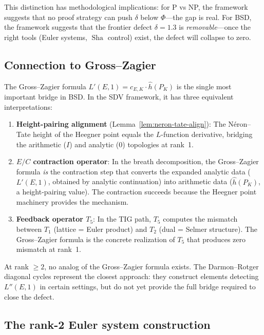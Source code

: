 \documentclass[11pt]{article}
\DeclareMathOperator{\Sha}{Sha}
\begin{document}
This distinction has methodological implications: for P vs NP, the framework
suggests that no proof strategy can push $\delta$ below $\Phi$---the gap is
real.  For BSD, the framework suggests that the frontier defect $\delta = 1.3$
is \emph{removable}---once the right tools (Euler systems, $\Sha$ control)
exist, the defect will collapse to zero.

\subsection{Connection to Gross--Zagier}

The Gross--Zagier formula $L'(E,1) = c_{E,K} \cdot \hat{h}(P_K)$ is the
single most important bridge in BSD.  In the SDV framework, it has three
equivalent interpretations:

\begin{enumerate}
  \item \textbf{Height-pairing alignment} (Lemma~\ref{lem:neron-tate-align}):
    The N\'eron--Tate height of the Heegner point equals the $L$-function
    derivative, bridging the arithmetic ($I$) and analytic ($0$) topologies
    at rank~1.

  \item \textbf{$E/C$ contraction operator}: In the breath decomposition, the
    Gross--Zagier formula \emph{is} the contraction step that converts the
    expanded analytic data ($L'(E,1)$, obtained by analytic continuation) into
    arithmetic data ($\hat{h}(P_K)$, a height-pairing value).  The contraction
    succeeds because the Heegner point machinery provides the mechanism.

  \item \textbf{Feedback operator $T_5$}: In the TIG path, $T_5$ computes the
    mismatch between $T_1$ (lattice = Euler product) and $T_2$ (dual = Selmer
    structure).  The Gross--Zagier formula is the concrete realization of
    $T_5$ that produces zero mismatch at rank~1.
\end{enumerate}

\noindent
At rank $\geq 2$, no analog of the Gross--Zagier formula exists.  The
Darmon--Rotger diagonal cycles \cite{DR} represent the closest approach: they
construct elements detecting $L''(E,1)$ in certain settings, but do not yet
provide the full bridge required to close the defect.

\subsection{The rank-2 Euler system construction}
\end{document}
